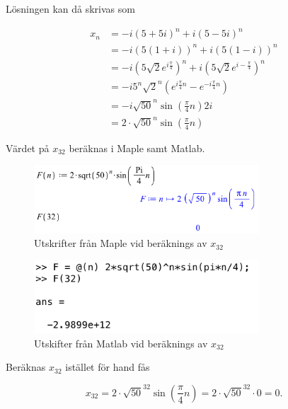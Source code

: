 \documentclass[a4paper]{article}
\begin{document}
Lösningen kan då skrivas som

\begin{align*}
	x_n		&= -i(5+5i)^n + i(5-5i)^n\\
			&= -i(5(1+i))^n + i(5(1-i))^n\\
			&= -i(5\sqrt{2}e^{i\frac{\pi}{4}})^n + i(5\sqrt{2}e^{i-\frac{\pi}{4}})^n\\
			&= -i5^n\sqrt{2}^n(e^{i\frac{\pi}{4}n} - e^{-i\frac{\pi}{4}n})\\
			&= -i\sqrt{50}^n\sin\left(\frac{\pi}{4}n\right)2i\\
			&= 2\cdot\sqrt{50}^n\sin\left(\frac{\pi}{4}n\right)
\end{align*}

Värdet på $x_{32}$ beräknas i Maple samt Matlab.

\begin{figure}[h!]
	\centering
	\includegraphics[width=0.75\textwidth]{maple.png}
	\caption{Utskrifter från Maple vid beräknings av $x_{32}$}
	\label{fig:maple}
\end{figure}

\begin{figure}[h!]
	\centering
	\includegraphics[width=0.75\textwidth]{matlab.png}
	\caption{Utskifter från Matlab vid beräknings av $x_{32}$}
	\label{fig:matlab}
\end{figure}

Beräknas $x_{32}$ istället för hand fås

\begin{equation*}
	x_{32} = 2\cdot\sqrt{50}^{32}\sin\left(\frac{\pi}{4}n\right) = 2\cdot\sqrt{50}^{32}\cdot 0 = 0.
\end{equation*}

\end{document}
